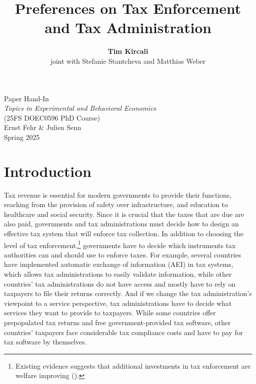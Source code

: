 \documentclass[11pt]{article}
\title{\vspace{2cm}\textbf{Preferences on Tax Enforcement and Tax Administration} \vspace{2cm}}
\author{\textbf{Tim Kircali} \\ joint with Stefanie Stantcheva and Matthias Weber}
\date{}
\begin{document}
\maketitle
\thispagestyle{empty}

\vspace{2cm}

\begin{center}
    Paper Hand-In\\
    \vspace{0.5cm}
    \textit{Topics in Experimental and Behavioral Economics} \\
    (25FS DOEC0596 PhD Course) \\
    \vspace{0.5cm}
    Ernst Fehr \& Julien Senn \\
    Spring 2025
\end{center}

\newpage
{}
\section{Introduction}
Tax revenue is essential for modern governments to provide their functions, reaching from the provision of safety over infrastructure, and education to healthcare and social security. Since it is crucial that the taxes that are due are also paid, governments and tax administrations must decide how to design an effective tax system that will enforce tax collection. In addition to choosing the level of tax enforcement,\footnote{Existing evidence suggests that additional investments in tax enforcement are welfare improving (\cite{boning2025welfare}).} governments have to decide which instruments tax authorities can and should use to enforce taxes. For example, several countries have implemented automatic exchange of information (AEI) in tax systems, which allows tax administrations to easily validate information, while other countries' tax administrations do not have access and mostly have to rely on taxpayers to file their returns correctly. And if we change the tax administration's viewpoint to a service perspective, tax administrations have to decide what services they want to provide to taxpayers. While some countries offer prepopulated tax returns and free government-provided tax software, other countries' taxpayers face considerable tax compliance costs and have to pay for tax software by themselves.%
\end{document}
